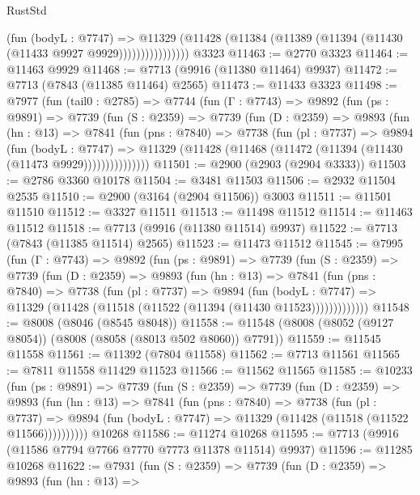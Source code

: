\begin{lexlean}{RustStd}
\begin{coremodule}
                      (fun (bodyL : @7747) =>
                      @11329
                        (@11428 (@11384 (@11389 (@11394 (@11430 (@11433 @9927 @9929))))))))))))))))
    @3323
@11463 := @2770 @3323
@11464 := @11463 @9929
@11468 := @7713 (@9916 (@11380 @11464) @9937)
@11472 := @7713 (@7843 (@11385 @11464) @2565)
@11473 := @11433 @3323
@11498 := @7977
    (fun (tail0 : @2785) =>
    @7744
      (fun (Γ : @7743) =>
      @9892
        (fun (ps : @9891) =>
        @7739
          (fun (S : @2359) =>
          @7739
            (fun (D : @2359) =>
            @9893
              (fun (hn : @13) =>
              @7841
                (fun (pns : @7840) =>
                @7738
                  (fun (pl : @7737) =>
                  @9894
                    (fun (bodyL : @7747) =>
                    @11329 (@11428 (@11468 (@11472 (@11394 (@11430 (@11473 @9929)))))))))))))))
@11501 := @2900 (@2903 (@2904 @3333))
@11503 := @2786 @3360 @10178
@11504 := @3481 @11503
@11506 := @2932 @11504 @2535
@11510 := @2900 (@3164 (@2904 @11506)) @3003
@11511 := @11501 @11510
@11512 := @3327 @11511
@11513 := @11498 @11512
@11514 := @11463 @11512
@11518 := @7713 (@9916 (@11380 @11514) @9937)
@11522 := @7713 (@7843 (@11385 @11514) @2565)
@11523 := @11473 @11512
@11545 := @7995
    (fun (Γ : @7743) =>
    @9892
      (fun (ps : @9891) =>
      @7739
        (fun (S : @2359) =>
        @7739
          (fun (D : @2359) =>
          @9893
            (fun (hn : @13) =>
            @7841
              (fun (pns : @7840) =>
              @7738
                (fun (pl : @7737) =>
                @9894
                  (fun (bodyL : @7747) =>
                  @11329 (@11428 (@11518 (@11522 (@11394 (@11430 @11523)))))))))))))
@11548 := @8008 (@8046 (@8545 @8048))
@11558 := @11548 (@8008 (@8052 (@9127 @8054)) (@8008 (@8058 (@8013 @502 @8060)) @7791))
@11559 := @11545 @11558
@11561 := @11392 (@7804 @11558)
@11562 := @7713 @11561
@11565 := @7811 @11558 @11429 @11523
@11566 := @11562 @11565
@11585 := @10233
    (fun (ps : @9891) =>
    @7739
      (fun (S : @2359) =>
      @7739
        (fun (D : @2359) =>
        @9893
          (fun (hn : @13) =>
          @7841
            (fun (pns : @7840) =>
            @7738
              (fun (pl : @7737) =>
              @9894 (fun (bodyL : @7747) => @11329 (@11428 (@11518 (@11522 @11566))))))))))
    @10268
@11586 := @11274 @10268
@11595 := @7713 (@9916 (@11586 @7794 @7766 @7770 @7773 @11378 @11514) @9937)
@11596 := @11285 @10268
@11622 := @7931
    (fun (S : @2359) =>
    @7739
      (fun (D : @2359) =>
      @9893
        (fun (hn : @13) =>

\end{coremodule}
\end{lexlean}
